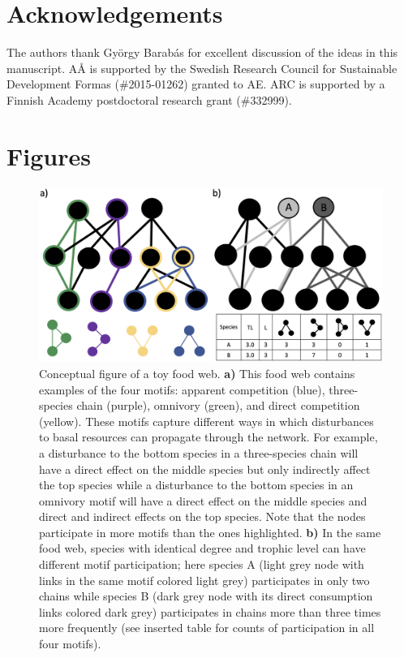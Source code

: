 \documentclass[12pt]{article}
\begin{document}
\begin{spacing}{2.0}
\section*{Acknowledgements}

    The authors thank Gy\"{o}rgy Barab\'{a}s for excellent discussion of the ideas in this manuscript. A{\AA} is supported by the Swedish Research Council for Sustainable Development Formas (\#2015-01262) granted to AE. ARC is supported by a Finnish Academy postdoctoral research grant (\#332999).

\clearpage    

\section*{Figures}
    

        \begin{figure}[hb!]
        \centering
        \includegraphics[width=1.0\textwidth]{figures/concept_fig_ver2.eps}
        \caption{Conceptual figure of a toy food web. \textbf{a)} This food web contains examples of the four motifs: apparent competition (blue), three-species chain (purple), omnivory (green), and direct competition (yellow). These motifs capture different ways in which disturbances to basal resources can propagate through the network. For example, a disturbance to the bottom species in a three-species chain will have a direct effect on the middle species but only indirectly affect the top species while a disturbance to the bottom species in an omnivory motif will have a direct effect on the middle species and direct and indirect effects on the top species. 
        Note that the nodes participate in more motifs than the ones highlighted. \textbf{b)} In the same food web, species with identical degree and trophic level can have different motif participation; here species A (light grey node with links in the same motif colored light grey) participates in only two chains while species B (dark grey node with its direct consumption links colored dark grey) participates in chains more than three times more frequently (see inserted table for counts of participation in all four motifs). 
}
\end{figure}
\end{spacing}
\end{document}
